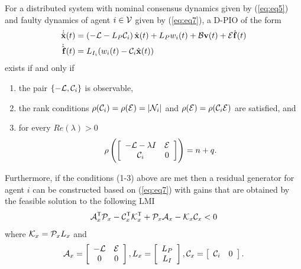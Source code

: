 \documentclass[letterpaper, 11 pt, conference]{ieeeconf}  %
\begin{document}
\begin{theorem}
For a distributed system with nominal consensus dynamics given by (\ref{eq:eq5}) 
and faulty dynamics of agent $i \in \mathcal{V}$ given by (\ref{eq:eq7}),
a D-PIO of the form
\begin{gather} \label{eq:eq7}
\begin{aligned}
\dot{\hat{\mathbf{x}}}(t) &= \left ( -\mathcal{L} - L_{P} \mathcal{C}_i \right ) \hat{\mathbf{x}}(t) + L_{P} w_i(t) + \mathcal{B} \mathbf{v}(t) + \mathcal{E}\hat{\mathbf{f}} (t) \\
\dot{\hat{\mathbf{f}}} (t) &= L_{I_i} (w_i (t) - \mathcal{C}_i\hat{\mathbf{x}} (t))
\end{aligned}
\end{gather}
exists if and only if
\begin{enumerate}
\item the pair $\{ -\mathcal{L}, \mathcal{C}_i \}$ is observable, 
\item the rank conditions $\rho(\mathcal{C}_i) = \rho (\mathcal{E}) = |\mathcal{N}_i|$ and $\rho(\mathcal{E}) = \rho(\mathcal{C}_i \mathcal{E})$ are satisfied, and 
\item for every $Re (\lambda) > 0$ 
\begin{align*}
\rho \left ( \left [ \begin{array}{cc} -\mathcal{L} - \lambda I & \mathcal{E} \\ \mathcal{C}_i & 0 \end{array} \right ] \right ) = n+q. 
\end{align*}
\end{enumerate}
Furthermore, if the conditions (1-3) above are met then a residual generator for agent $i$ can be constructed based on (\ref{eq:eq7}) with gains that are obtained by the feasible solution to the following LMI
\begin{align} \label{eq:eq8}
\mathcal{A}_x^{\mathsf{T}} \mathcal{P}_x -\mathcal{C}_x^{\mathsf{T}}\mathcal{K}_x^{\mathsf{T}} + \mathcal{P}_x \mathcal{A}_x - \mathcal{K}_x \mathcal{C}_x < 0  
\end{align}
where $\mathcal{K}_x = \mathcal{P}_x L_x$ and 
\begin{align*}
\mathcal{A}_x = \left [ \begin{array}{cc} -\mathcal{L} & \mathcal{E} \\ 0 & 0 \end{array} \right ], 
L_x = \left [ \begin{array}{c} L_{P} \\ L_{I} \end{array} \right], 
\mathcal{C}_x = \left [\begin{array}{cc} \mathcal{C}_i & 0 \end{array} \right ].
\end{align*}
\end{theorem}
\end{document}
